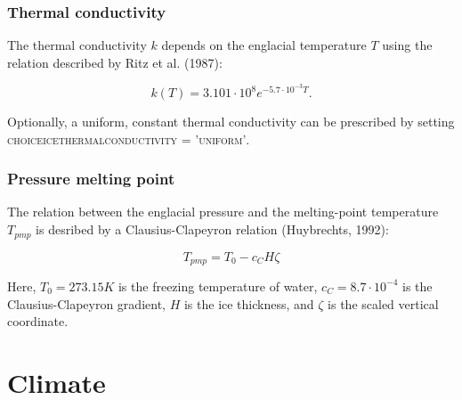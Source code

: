 \documentclass{article}
\begin{document}
\subsubsection{Thermal conductivity}

The thermal conductivity $k$ depends on the englacial temperature $T$ using the relation described by Ritz et al. (1987):

\begin{equation}
k \left( T \right) = 3.101 \cdot 10^8 e^{-5.7 \cdot 10^{-3} T}.
\end{equation}

Optionally, a uniform, constant thermal conductivity can be prescribed by setting \textsc{choice\textunderscore ice\textunderscore thermal\textunderscore conductivity = 'uniform'}.

\subsubsection{Pressure melting point}

The relation between the englacial pressure and the melting-point temperature $T_{pmp}$ is desribed by a Clausius-Clapeyron relation (Huybrechts, 1992):

\begin{equation}
T_{pmp} = T_0 - c_C H \zeta
\end{equation}

Here, $T_0 = 273.15 K$ is the freezing temperature of water, $c_C = 8.7 \cdot 10^{-4}$ is the Clausius-Clapeyron gradient, $H$ is the ice thickness, and $\zeta$ is the scaled vertical coordinate.

\newpage
\section{Climate}
\end{document}
